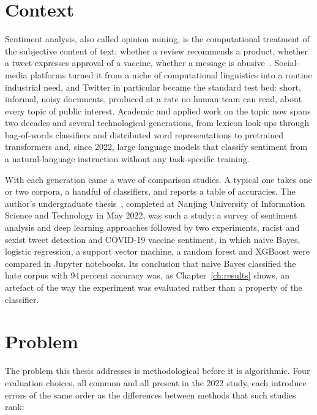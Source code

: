 \section{Context}
Sentiment analysis, also called opinion mining, is the computational treatment of the subjective content of text: whether a review recommends a product, whether a tweet expresses approval of a vaccine, whether a message is abusive~\cite{pang2008,liu2012}. Social-media platforms turned it from a niche of computational linguistics into a routine industrial need, and Twitter in particular became the standard test bed: short, informal, noisy documents, produced at a rate no human team can read, about every topic of public interest. Academic and applied work on the topic now spans two decades and several technological generations, from lexicon look-ups through bag-of-words classifiers and distributed word representations to pretrained transformers and, since 2022, large language models that classify sentiment from a natural-language instruction without any task-specific training.

With each generation came a wave of comparison studies. A typical one takes one or two corpora, a handful of classifiers, and reports a table of accuracies. The author's undergraduate thesis~\cite{sium2022}, completed at Nanjing University of Information Science and Technology in May 2022, was such a study: a survey of sentiment analysis and deep learning approaches followed by two experiments, racist and sexist tweet detection and COVID-19 vaccine sentiment, in which naive Bayes, logistic regression, a support vector machine, a random forest and XGBoost were compared in Jupyter notebooks. Its conclusion that naive Bayes classified the hate corpus with 94\,percent accuracy was, as Chapter~\ref{ch:results} shows, an artefact of the way the experiment was evaluated rather than a property of the classifier.

\section{Problem}
The problem this thesis addresses is methodological before it is algorithmic. Four evaluation choices, all common and all present in the 2022 study, each introduce errors of the same order as the differences between methods that such studies rank:

